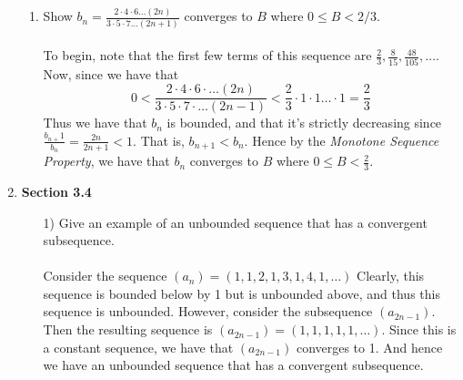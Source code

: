 \documentclass[12pt,letterpaper]{article}
\theoremstyle{case}
\theoremstyle{definition}
\begin{document}
\begin{enumerate}
\begin{enumerate}
		\item Show $b_n = \frac{2 \cdot 4 \cdot 6 \dots (2n)}{3 \cdot 5 \cdot 7 \dots (2n+1)}$ converges to $B$ where $0 \leq B < 2/3$.
		\\\\To begin, note that the first few terms of this sequence are $\frac{2}{3}, \frac{8}{15}, \frac{48}{105}, \dots$. Now, since we have that
		\[0 < \frac{2 \cdot 4 \cdot 6 \cdot \dots (2n)}{3 \cdot 5 \cdot 7 \cdot \dots (2n-1)}<\frac{2}{3}\cdot 1 \cdot 1 \dots \cdot 1 = \frac{2}{3}\]
		Thus we have that $b_n$ is bounded, and that it's strictly decreasing since $\frac{b_{n+}1}{b_n}=\frac{2n}{2n+1}<1$. That is, $b_{n+1} < b_n$. Hence by the \textit{Monotone Sequence Property}, we have that $b_n$ converges to $B$ where $0 \leq B < \frac{2}{3}$.
	\end{enumerate}

	\item \textbf{Section 3.4}
	\begin{enumerate}
		\item[1)] Give an example of an unbounded sequence that has a convergent subsequence.
		\\\\Consider the sequence $(a_n)=(1,1,2,1,3,1,4,1, \dots)$ Clearly, this sequence is bounded below by 1 but is unbounded above, and thus this sequence is unbounded. However, consider the subsequence $(a_{2n-1})$. Then the resulting sequence is $(a_{2n-1})=(1,1,1,1,1, \dots)$. Since this is a constant sequence, we have that $(a_{2n-1})$ converges to 1. And hence we have an unbounded sequence that has a convergent subsequence.
		

\end{enumerate}
\end{enumerate}
\end{document}
